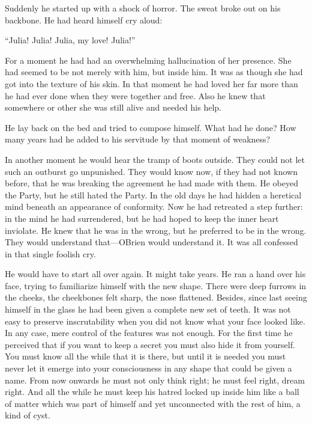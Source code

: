 Suddenly he started up with a shock of horror. The sweat broke out on
his backbone. He had heard himself cry aloud:

``Julia! Julia! Julia, my love! Julia!''

For a moment he had had an overwhelming hallucination of her presence.
She had seemed to be not merely with him, but inside him. It was as
though she had got into the texture of his skin. In that moment he had
loved her far more than he had ever done when they were together and
free. Also he knew that somewhere or other she was still alive and
needed his help.

He lay back on the bed and tried to compose himself. What had he done?
How many years had he added to his servitude by that moment of weakness?

In another moment he would hear the tramp of boots outside. They could
not let such an outburst go unpunished. They would know now, if they had
not known before, that he was breaking the agreement he had made with
them. He obeyed the Party, but he still hated the Party. In the old days
he had hidden a heretical mind beneath an appearance of conformity. Now
he had retreated a step further: in the mind he had surrendered, but he
had hoped to keep the inner heart inviolate. He knew that he was in the
wrong, but he preferred to be in the wrong. They would understand
that---O\textquotesingle Brien would understand it. It was all confessed
in that single foolish cry.

He would have to start all over again. It might take years. He ran a
hand over his face, trying to familiarize himself with the new shape.
There were deep furrows in the cheeks, the cheekbones felt sharp, the
nose flattened. Besides, since last seeing himself in the glass he had
been given a complete new set of teeth. It was not easy to preserve
inscrutability when you did not know what your face looked like. In any
case, mere control of the features was not enough. For the first time he
perceived that if you want to keep a secret you must also hide it from
yourself. You must know all the while that it is there, but until it is
needed you must never let it emerge into your consciousness in any shape
that could be given a name. From now onwards he must not only think
right; he must feel right, dream right. And all the while he must keep
his hatred locked up inside him like a ball of matter which was part of
himself and yet unconnected with the rest of him, a kind of cyst.

